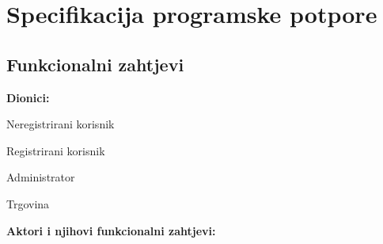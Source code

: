 \chapter{Specifikacija programske potpore}
		
	\section{Funkcionalni zahtjevi}
			
			
				
			
			
			\noindent \textbf{Dionici:}
			 
			\begin{packed_enum}
				
				\item Neregistrirani korisnik
				\item Registrirani korisnik				
				\item Administrator
                \item Trgovina\\
				
			\end{packed_enum}
   
			
			\noindent \textbf{Aktori i njihovi funkcionalni zahtjevi:}
			
